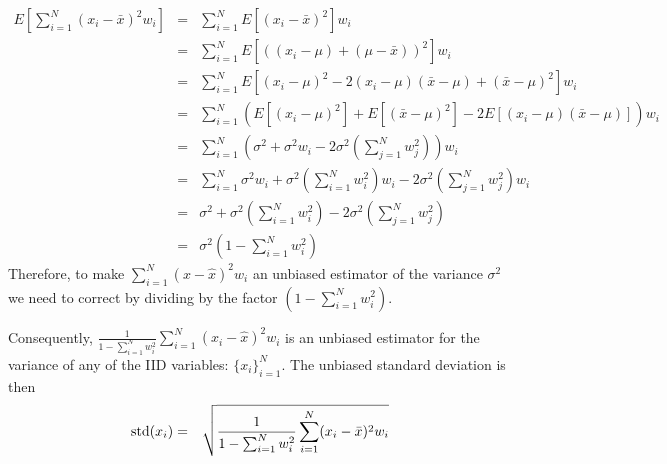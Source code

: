 \documentclass{article}
\begin{document}
\begin{eqnarray*}
    E\left[ \sum_{i=1}^N (x_i - {\bar x})^2 w_i \right] & = & \sum_{i=1}^N E\left[(x_i - {\bar x})^2\right] w_i \\
    & = & \sum_{i=1}^N E\left[\left((x_i - \mu) + (\mu - {\bar x})\right)^2\right] w_i \\
    & = & \sum_{i=1}^N E\left[(x_i - \mu)^2 - 2(x_i - \mu)({\bar x} - \mu ) + ({\bar x} - \mu)^2\right] w_i \\
    & = & \sum_{i=1}^N \left( E\left[(x_i - \mu)^2\right] + E\left[ ({\bar x} - \mu)^2\right] 
              - 2E\left[(x_i - \mu) ({\bar x} - \mu) \right] \right) w_i \\
    & = & \sum_{i=1}^N \left(\sigma^2  + \sigma^2 w_i - 2\sigma^2 \left( \sum_{j=1}^N w_j^2 \right)\right)w_i  \\
    & = & \sum_{i=1}^N \sigma^2w_i + \sigma^2 \left( \sum_{i=1}^N w_i^2 \right)w_i - 2\sigma^2 \left( \sum_{j=1}^N w_j^2 \right)w_i \\ 
    & = & \sigma^2 + \sigma^2 \left( \sum_{i=1}^N w_i^2 \right) - 2\sigma^2 \left( \sum_{j=1}^N w_j^2 \right) \\ 
    & = & \sigma^2\left(1 - \sum_{i=1}^N w_i^2\right) 
\end{eqnarray*}
Therefore, to make $\sum_{i=1}^N (x - {\hat x})^2 w_i$ an unbiased estimator of the variance $\sigma^2$ 
we need to correct by dividing by the factor $\left( 1 - \sum_{i=1}^N w_i^2 \right)$.

Consequently, $\frac{1}{1 - \sum_{i=1}^N w_i^2} \sum_{i=1}^N (x_i - {\hat x})^2 w_i$ 
is an unbiased estimator for the variance of any of the IID variables: $\{x_i\}_{i=1}^N$. 
The unbiased standard deviation is then
\begin{eqnarray}
    {\rm std}(x_i) & = & \sqrt{\frac{1}{1 - \sum_{i=1}^N w_i^2} \sum_{i=1}^N (x_i - {\bar x})^2 w_i}
\end{eqnarray}
\end{document}
